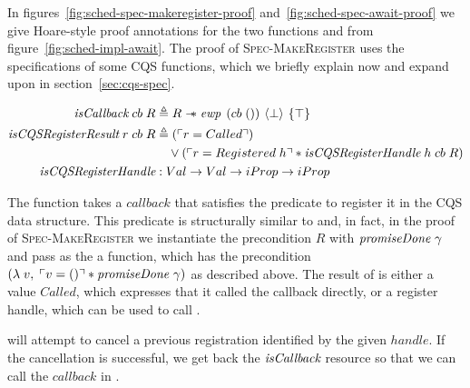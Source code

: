 In figures~\ref{fig:sched-spec-makeregister-proof} and~\ref{fig:sched-spec-await-proof} we give Hoare-style proof annotations for the two functions  and  from figure~\ref{fig:sched-impl-await}.
The proof of \textsc{Spec-MakeRegister} uses the specifications of some CQS functions, which we briefly explain now and expand upon in section~\ref{sec:cqs-spec}.

\begin{align*}
  \gsIsCb{}\; cb\; R                      & \triangleq R \wand \ewp{cb\; ()}{\bot}{\top}                                                     \\
  \emph{isCQSRegisterResult}\; r\; cb\; R & \triangleq (\ulcorner r = Called \urcorner)                                                      \\
                                          & \quad \vee (\ulcorner r = Registered\; h \urcorner \ast \emph{isCQSRegisterHandle}\; h\; cb\; R) \\
  \emph{isCQSRegisterHandle}              & : Val \to Val \to iProp \to iProp
\end{align*}


The function  takes a \(callback\) that satisfies the \gsIsCb{} predicate to register it in the CQS data structure.
This predicate is structurally similar to \gsIsWaker{} and, in fact, in the proof of \textsc{Spec-MakeRegister} we instantiate the precondition \(R\) with \(\emph{promiseDone}~\gamma{}\) and pass as the  a  function, which has the precondition \((\lambda\; v,\; \ulcorner v = () \urcorner \ast \emph{promiseDone}~\gamma{})\) as described above.
The result of  is either a value \(Called\), which expresses that it called the callback directly, or a register handle, which can be used to call .

 will attempt to cancel a previous registration identified by the given \(handle\).
If the cancellation is successful, we get back the \(\emph{isCallback}{}\) resource so that we can call the \(callback\) in .

